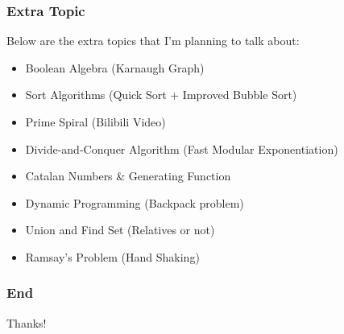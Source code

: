 \documentclass{beamer}
\begin{document}
\begin{frame}
    \frametitle{Extra Topic}
    Below are the extra topics that I'm planning to talk about:
    \begin{itemize}
        \item Boolean Algebra (Karnaugh Graph)
        \item Sort Algorithms (Quick Sort + Improved Bubble Sort)
        \item Prime Spiral (Bilibili Video)
        \item Divide-and-Conquer Algorithm (Fast Modular Exponentiation)  
        \item Catalan Numbers \& Generating Function
        \item Dynamic Programming (Backpack problem)
        \item Union and Find Set (Relatives or not)
        \item Ramsay's Problem (Hand Shaking)
    \end{itemize}
\end{frame}
\begin{frame}
    \frametitle{End}
    \Huge
    \centering
    Thanks!
\end{frame}
\end{document}
